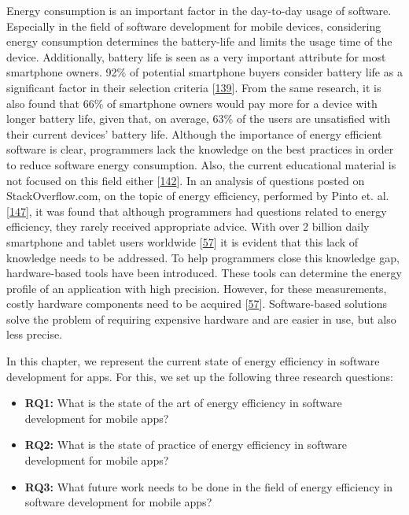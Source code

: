\documentclass[]{book}
\providecommand{\tightlist}{%
  \setlength{\itemsep}{0pt}\setlength{\parskip}{0pt}}
\begin{document}
Energy consumption is an important factor in the day-to-day usage of
software. Especially in the field of software development for mobile
devices, considering energy consumption determines the battery-life and
limits the usage time of the device. Additionally, battery life is seen
as a very important attribute for most smartphone owners. 92\% of
potential smartphone buyers consider battery life as a significant
factor in their selection criteria
{[}\protect\hyperlink{ref-OOC2017}{139}{]}. From the same research, it
is also found that 66\% of smartphone owners would pay more for a device
with longer battery life, given that, on average, 63\% of the users are
unsatisfied with their current devices' battery life. Although the
importance of energy efficient software is clear, programmers lack the
knowledge on the best practices in order to reduce software energy
consumption. Also, the current educational material is not focused on
this field either {[}\protect\hyperlink{ref-PHA2016}{142}{]}. In an
analysis of questions posted on StackOverflow.com, on the topic of
energy efficiency, performed by Pinto et. al.
{[}\protect\hyperlink{ref-PCL2014}{147}{]}, it was found that although
programmers had questions related to energy efficiency, they rarely
received appropriate advice. With over 2 billion daily smartphone and
tablet users worldwide {[}\protect\hyperlink{ref-NPPPZL2017}{57}{]} it
is evident that this lack of knowledge needs to be addressed. To help
programmers close this knowledge gap, hardware-based tools have been
introduced. These tools can determine the energy profile of an
application with high precision. However, for these measurements, costly
hardware components need to be acquired
{[}\protect\hyperlink{ref-NPPPZL2017}{57}{]}. Software-based solutions
solve the problem of requiring expensive hardware and are easier in use,
but also less precise.

In this chapter, we represent the current state of energy efficiency in
software development for apps. For this, we set up the following three
research questions:

\begin{itemize}
\tightlist
\item
  \textbf{RQ1:} What is the state of the art of energy efficiency in
  software development for mobile apps?
\item
  \textbf{RQ2:} What is the state of practice of energy efficiency in
  software development for mobile apps?
\item
  \textbf{RQ3:} What future work needs to be done in the field of energy
  efficiency in software development for mobile apps?
\end{itemize}
\end{document}
